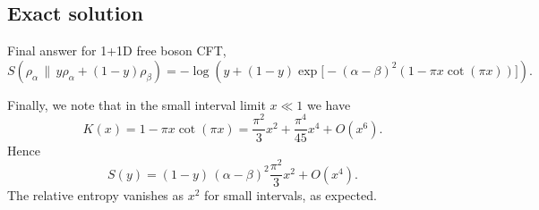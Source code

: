 \documentclass[11pt]{article}
\begin{document}
\subsection*{Exact solution}
Final answer for 1+1D free boson CFT,
  \begin{equation}
    \boxed{ S\!\left(\rho_\alpha\,\Big\|\,y\rho_\alpha+(1-y)\rho_\beta\right) = -\log\!\left( y+(1-y)\exp\!\big[-(\alpha-\beta)^2(1-\pi x\cot(\pi x))\big] \right). }
    \label{eq:S-final}
  \end{equation}

Finally, we note that in the small interval limit $x\ll 1$ we have
  \begin{equation}
    K(x)=1-\pi x\cot(\pi x)=\frac{\pi^{2}}{3}x^{2}+\frac{\pi^{4}}{45}x^{4}+O(x^{6}
    ).
  \end{equation}
  Hence
  \begin{equation}
    S(y)= (1-y)\,(\alpha-\beta)^{2}\frac{\pi^{2}}{3}x^{2}+O(x^{4}).
  \end{equation}
  The relative entropy vanishes as $x^{2}$ for small intervals, as expected.  
\end{document}
